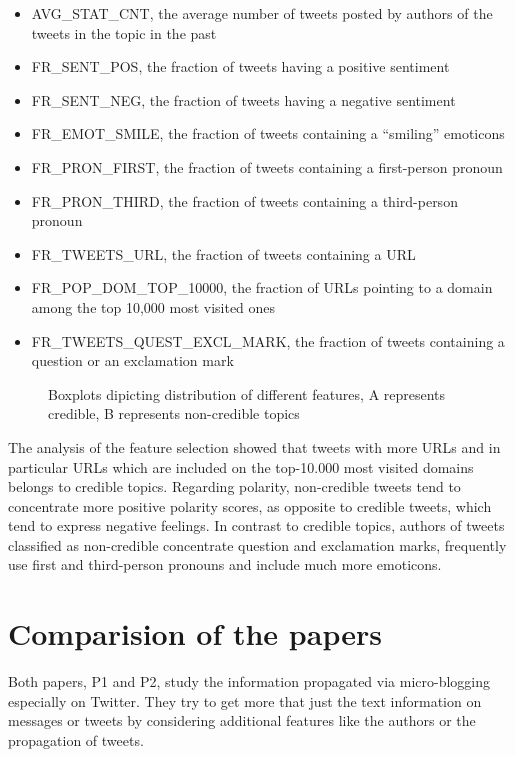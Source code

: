 \documentclass{proseminar}
\begin{document}
\begin{itemize}
\item AVG\_STAT\_CNT, the average number of tweets posted by authors of the tweets in the topic in the past
\item FR\_SENT\_POS, the fraction of tweets having a positive sentiment
\item FR\_SENT\_NEG, the fraction of tweets having a negative sentiment
\item FR\_EMOT\_SMILE, the fraction of tweets containing a “smiling” emoticons
\item FR\_PRON\_FIRST, the fraction of tweets containing a first-person pronoun
\item FR\_PRON\_THIRD, the fraction of tweets containing a third-person pronoun
\item FR\_TWEETS\_URL, the fraction of tweets containing a URL
\item FR\_POP\_DOM\_TOP\_10000, the fraction of URLs pointing to a domain among the top 10,000 most visited ones
\item FR\_TWEETS\_QUEST\_EXCL\_MARK, the fraction of tweets containing a question or an exclamation mark
\end{itemize}


\begin{figure}[h]
\centering
{}
\caption{Boxplots dipicting distribution of different features, A represents credible, B represents non-credible topics}
\label{fig:boxCredibility}
\end{figure}

The analysis of the feature selection showed that tweets with more URLs and in particular URLs which are included on the top-10.000 most visited domains belongs to credible topics. 
Regarding polarity, non-credible tweets tend to concentrate more positive polarity scores, as opposite to credible tweets, which tend to express negative feelings.
In contrast to credible topics, authors of tweets classified as non-credible concentrate question and exclamation marks, frequently use first and third-person pronouns and include much more emoticons.



\section{Comparision of the papers}
Both papers, P1 and P2, study the information propagated via micro-blogging especially on Twitter. They try to get more that just the text information on messages or tweets by considering additional features like the authors or the propagation of tweets.
\end{document}
